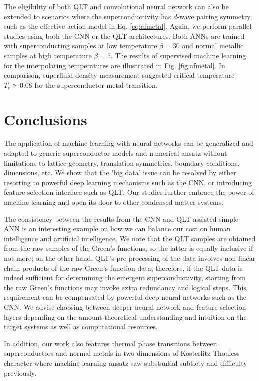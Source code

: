 \documentclass[amsmath,amssymb, aps, prl, twocolumn]{revtex4-1}
\begin{document}
The eligibility of both QLT and convolutional neural network can also be extended to scenarios where the superconductivity has $d$-wave pairing symmetry, such as the effective action model in Eq. \ref{eq:afmetal}. Again, we perform parallel studies using both the CNN or the QLT architectures. Both ANNs are trained with superconducting samples at low temperature $\beta=30$ and normal metallic samples at high temperature $\beta=5$. The results of supervised machine learning for the interpolating temperatures are illustrated in Fig. \ref{fig:afmetal}. In comparison, superfluid density measurement suggested critical temperature $T_c\simeq 0.08$ for the superconductor-metal transition\cite{Erez2016}.


\section{Conclusions} 
The application of machine learning with neural networks can be generalized and adapted to generic superconductor models and numerical ansatz without limitations to lattice geometry, translation symmetries, boundary conditions, dimensions, etc. We show that the 'big data' issue can be resolved by either resorting to powerful deep learning mechanisms such as the CNN, or introducing feature-selection interface such as QLT. Our studies further embrace the power of machine learning and open its door to other condensed matter systems.

The consistency between the results from the CNN and QLT-assisted simple ANN is an interesting example on how we can balance our cost on human intelligence and artificial intelligence. We note that the QLT samples are obtained from the raw samples of the Green's functions, so the latter is equally inclusive if not more; on the other hand, QLT's pre-processing of the data involves non-linear chain products of the raw Green's function data, therefore, if the QLT data is indeed sufficient for determining the emergent superconductivity, starting from the raw Green's functions may invoke extra redundancy and logical steps. This requirement can be compensated by powerful deep neural networks such as the CNN. We advise choosing between deeper neural network and feature-selection layers depending on the amount theoretical understanding and intuition on the target systems as well as computational resources. 

In addition, our work also features thermal phase transitions between superconductors and normal metals in two dimensions of Kosterlitz-Thouless character where machine learning ansatz saw substantial subtlety and difficulty previously\cite{Anna2018}. 
\end{document}
